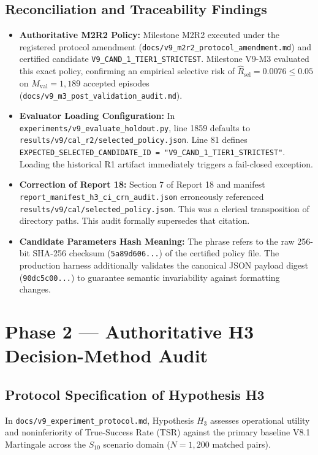 \documentclass[10pt,a4paper]{article}
\begin{document}
\subsection{Reconciliation and Traceability Findings}
\begin{itemize}
    \item \textbf{Authoritative M2R2 Policy:} Milestone M2R2 executed under the registered protocol amendment (\texttt{docs/v9\_m2r2\_protocol\_amendment.md}) and certified candidate \texttt{V9\_CAND\_1\_TIER1\_STRICTEST}. Milestone V9-M3 evaluated this exact policy, confirming an empirical selective risk of $\widehat{R}_{\text{sel}} = 0.0076 \le 0.05$ on $M_{\text{val}} = 1,189$ accepted episodes (\texttt{docs/v9\_m3\_post\_validation\_audit.md}).
    \item \textbf{Evaluator Loading Configuration:} In \texttt{experiments/v9\_evaluate\_holdout.py}, line 1859 defaults to \texttt{results/v9/cal\_r2/selected\_policy.json}. Line 81 defines \texttt{EXPECTED\_SELECTED\_CANDIDATE\_ID = "V9\_CAND\_1\_TIER1\_STRICTEST"}. Loading the historical R1 artifact immediately triggers a fail-closed exception.
    \item \textbf{Correction of Report 18:} Section 7 of Report 18 and manifest \texttt{report\_manifest\_h3\_ci\_crn\_audit.json} erroneously referenced \texttt{results/v9/cal/selected\_policy.json}. This was a clerical transposition of directory paths. This audit formally supersedes that citation.
    \item \textbf{Candidate Parameters Hash Meaning:} The phrase refers to the raw 256-bit SHA-256 checksum (\texttt{5a89d606...}) of the certified policy file. The production harness additionally validates the canonical JSON payload digest (\texttt{90dc5c00...}) to guarantee semantic invariability against formatting changes.
\end{itemize}

\section{Phase 2 --- Authoritative H3 Decision-Method Audit}

\subsection{Protocol Specification of Hypothesis H3}
In \texttt{docs/v9\_experiment\_protocol.md}, Hypothesis $H_3$ assesses operational utility and noninferiority of True-Success Rate (TSR) against the primary baseline V8.1 Martingale across the $S_{10}$ scenario domain ($N = 1,200$ matched pairs).
\end{document}
